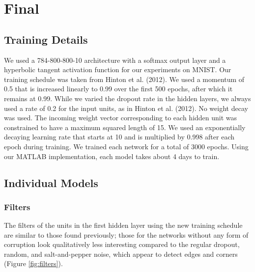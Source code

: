 \documentclass{article} %
\begin{document}
\section{Final}

\subsection{Training Details}

We used a 784-800-800-10 architecture with a softmax output layer and a hyperbolic tangent activation function for our experiments on MNIST. Our training schedule was taken from Hinton et al. (2012). We used a momentum of 0.5 that is increased linearly to 0.99 over the first 500 epochs, after which it remains at 0.99. While we varied the dropout rate in the hidden layers, we always used a rate of 0.2 for the input units, as in Hinton et al. (2012). No weight decay was used. The incoming weight vector corresponding to each hidden unit was constrained to have a maximum squared length of 15. We used an exponentially decaying learning rate that starts at 10 and is multiplied by 0.998 after each epoch during training. We trained each network for a total of 3000 epochs. Using our MATLAB implementation, each model takes about 4 days to train.

\subsection{Individual Models}

\subsubsection{Filters}
The filters of the units in the first hidden layer using the new training schedule are similar to those found previously; those for the networks without any form of corruption look qualitatively less interesting compared to the regular dropout, random, and salt-and-pepper noise, which appear to detect edges and corners (Figure \ref{fig:filters}).
\end{document}
